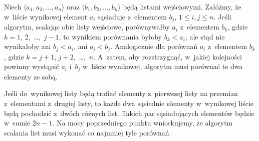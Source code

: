 \subproblem %
Niech $\langle a_1,a_2,\dots,a_n\rangle$ oraz $\langle b_1,b_2,\dots,b_n\rangle$ będą listami wejściowymi. Załóżmy, że w~liście wynikowej element $a_i$ sąsiaduje z~elementem $b_j$, $1\le i,j\le n$. Jeśli algorytm, scalając obie listy wejściowe, porównywałby $a_i$ z~elementem $b_k$, gdzie $k=1$, 2,~\dots,~$j-1$, to wynikiem porównania byłoby $b_k<a_i$, ale stąd nie wynikałoby ani $b_j<a_i$, ani $a_i<b_j$. Analogicznie dla porównań $a_i$ z~elementem $b_k$, gdzie $k=j+1$, $j+2$,~\dots,~$n$. A~zatem, aby rozstrzygnąć, w~jakiej kolejności powinny wystąpić $a_i$ i~$b_j$ w~liście wynikowej, algorytm musi porównać te dwa elementy ze sobą.

\subproblem %
Jeśli do~wynikowej listy będą trafiać elementy z~pierwszej listy na przemian z~elementami z~drugiej listy, to każde dwa sąsiednie elementy w~wynikowej liście będą pochodzić z~dwóch różnych list. Takich par sąsiadujących elementów będzie w~sumie $2n-1$. Na mocy poprzedniego punktu wnioskujemy, że algorytm scalania list musi wykonać co najmniej tyle porównań.

\endinput
